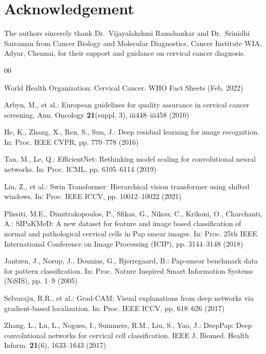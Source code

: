 \documentclass[runningheads]{llncs}
\begin{document}
\section*{Acknowledgement}
The authors sincerely thank Dr.~Vijayalakshmi Ramshankar and Dr.~Srinidhi Sairaman from Cancer Biology and Molecular Diagnostics, Cancer Institute WIA, Adyar, Chennai, for their support and guidance on cervical cancer diagnosis.

\begin{thebibliography}{00}

World Health Organization: Cervical Cancer. WHO Fact Sheets (Feb. 2022)

Arbyn, M., et al.: European guidelines for quality assurance in cervical cancer screening. Ann. Oncology \textbf{21}(suppl. 3), iii448--iii458 (2010)

He, K., Zhang, X., Ren, S., Sun, J.: Deep residual learning for image recognition. In: Proc. IEEE CVPR, pp. 770--778 (2016)

Tan, M., Le, Q.: EfficientNet: Rethinking model scaling for convolutional neural networks. In: Proc. ICML, pp. 6105--6114 (2019)

Liu, Z., et al.: Swin Transformer: Hierarchical vision transformer using shifted windows. In: Proc. IEEE ICCV, pp. 10012--10022 (2021)

Plissiti, M.E., Dimitrakopoulos, P., Sfikas, G., Nikou, C., Krikoni, O., Charchanti, A.: SIPaKMeD: A new dataset for feature and image based classification of normal and pathological cervical cells in Pap smear images. In: Proc. 25th IEEE International Conference on Image Processing (ICIP), pp. 3144--3148 (2018)

Jantzen, J., Norup, J., Dounias, G., Bjerregaard, B.: Pap-smear benchmark data for pattern classification. In: Proc. Nature Inspired Smart Information Systems (NiSIS), pp. 1--9 (2005)

Selvaraju, R.R., et al.: Grad-CAM: Visual explanations from deep networks via gradient-based localization. In: Proc. IEEE ICCV, pp. 618--626 (2017)

Zhang, L., Lu, L., Nogues, I., Summers, R.M., Liu, S., Yao, J.: DeepPap: Deep convolutional networks for cervical cell classification. IEEE J. Biomed. Health Inform. \textbf{21}(6), 1633--1643 (2017)


\end{thebibliography}
\end{document}
